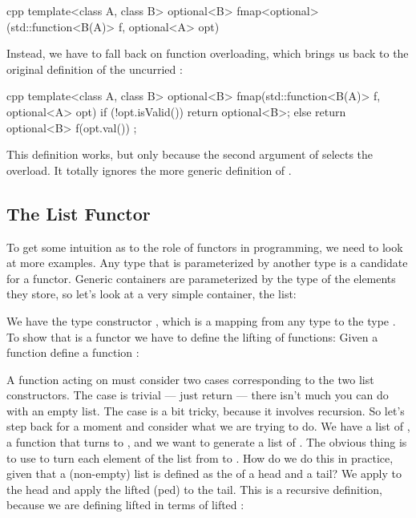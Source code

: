 \begin{snip}{cpp}
template<class A, class B>
optional<B> fmap<optional>(std::function<B(A)> f, optional<A> opt)
\end{snip}
Instead, we have to fall back on function overloading, which brings us
back to the original definition of the uncurried :

\begin{snip}{cpp}
template<class A, class B>
optional<B> fmap(std::function<B(A)> f, optional<A> opt) {
    if (!opt.isValid())
        return optional<B>{};
    else
        return optional<B>{ f(opt.val()) };
}
\end{snip}
This definition works, but only because the second argument of
 selects the overload. It totally ignores the more generic
definition of .

\subsection{The List Functor}

To get some intuition as to the role of functors in programming, we need
to look at more examples. Any type that is parameterized by another type
is a candidate for a functor. Generic containers are parameterized by
the type of the elements they store, so let's look at a very simple
container, the list:

We have the type constructor , which is a mapping from any
type  to the type . To show that 
is a functor we have to define the lifting of functions: Given a
function  define a function
:

A function acting on  must consider two cases
corresponding to the two list constructors. The  case is
trivial --- just return  --- there isn't much you can do
with an empty list. The  case is a bit tricky, because it
involves recursion. So let's step back for a moment and consider what we
are trying to do. We have a list of , a function 
that turns  to , and we want to generate a list of
. The obvious thing is to use  to turn each element
of the list from  to . How do we do this in
practice, given that a (non-empty) list is defined as the 
of a head and a tail? We apply  to the head and apply the
lifted (ped)  to the tail. This is a recursive
definition, because we are defining lifted  in terms of lifted
:

